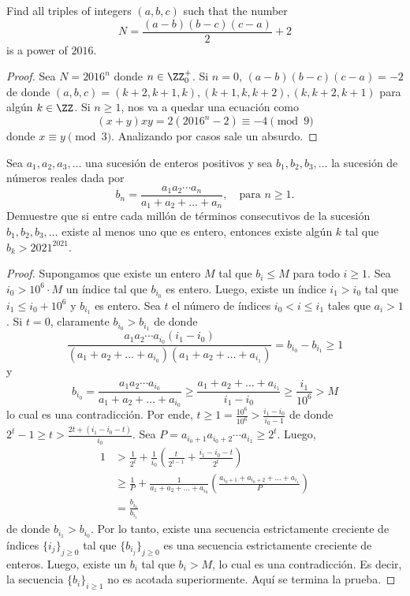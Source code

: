 \begin{probEB}
	Find all triples of integers $(a,b,c)$ such that the number
	\[N=\frac{(a-b)(b-c)(c-a)}{2}+2\]
	is a power of $2016$.
\end{probEB}

\begin{proof}
	Sea $N=2016^n$ donde $n\in\ZZ^+_0$. Si $n=0$, $(a-b)(b-c)(c-a)=-2$ de donde $(a,b,c)=(k+2,k+1,k),(k+1,k,k+2),(k,k+2,k+1)$ para algún $k\in\ZZ$. Si $n\ge 1$, nos va a quedar una ecuación como
	\[(x+y)xy=2(2016^n-2)\equiv -4\pmod 9\]
	donde $x\equiv y\pmod 3$. Analizando por casos sale un absurdo.
\end{proof}

\begin{probMB}[IberoAmerican 2021/3]
	Sea $a_1,a_2,a_3,\dots$ una sucesión de enteros positivos y sea $b_1,b_2,b_3,\dots$ la sucesión de números reales dada por
	\[b_n=\frac{a_1a_2\cdots a_n}{a_1+a_2+\dots+a_n},\quad\text{para }n\ge 1.\]
	Demuestre que si entre cada millón de términos consecutivos de la sucesión $b_1,b_2,b_3,\dots$ existe al menos uno que es entero, entonces existe algún $k$ tal que $b_k>2021^{2021}$.
\end{probMB}

\begin{proof}
	Supongamos que existe un entero $M$ tal que $b_i\le M$ para todo $i\ge 1$. Sea $i_0>10^6\cdot M$ un índice tal que $b_{i_0}$ es entero. Luego, existe un índice $i_1>i_0$ tal que $i_1\le i_0+10^6$ y $b_{i_1}$ es entero. Sea $t$ el número de índices $i_0<i\le i_1$ tales que $a_i>1$. Si $t=0$, claramente $b_{i_0}>b_{i_1}$ de donde
	\[\frac{a_1a_2\cdots a_{i_0}(i_1-i_0)}{(a_1+a_2+\dots+a_{i_0})(a_1+a_2+\dots+a_{i_1})}=b_{i_0}-b_{i_1}\ge 1\]
	y
	\[b_{i_0}=\frac{a_1a_2\cdots a_{i_0}}{a_1+a_2+\dots+a_{i_0}}\ge\frac{a_1+a_2+\dots+a_{i_1}}{i_1-i_0}\ge\frac{i_1}{10^6}>M\]
	lo cual es una contradicción. Por ende, $t\ge 1=\frac{10^6}{10^6}>\frac{i_1-i_0}{i_0-1}$ de donde $2^t-1\ge t>\frac{2t+(i_1-i_0-t)}{i_0}$. Sea $P=a_{i_0+1}a_{i_0+2}\cdots a_{i_1}\ge 2^t$. Luego,
	\begin{align*}
		1
		&>\frac{1}{2^t}+\frac{1}{i_0}\left(\frac{t}{2^{t-1}}+\frac{i_1-i_0-t}{2^t}\right) \\
		&\ge\frac{1}{P}+\frac{1}{a_1+a_2+\dots+a_{i_0}}\left(\frac{a_{i_0+1}+a_{i_0+2}+\dots+a_{i_1}}{P}\right) \\
		&=\frac{b_{i_0}}{b_{i_1}}
	\end{align*}
	de donde $b_{i_1}>b_{i_0}$. Por lo tanto, existe una secuencia estrictamente creciente de índices $\{i_j\}_{j\ge 0}$ tal que $\{b_{i_j}\}_{j\ge 0}$ es una secuencia estrictamente creciente de enteros. Luego, existe un $b_i$ tal que $b_i>M$, lo cual es una contradicción. Es decir, la secuencia $\{b_i\}_{i\ge 1}$ no es acotada superiormente. Aquí se termina la prueba.
\end{proof}

